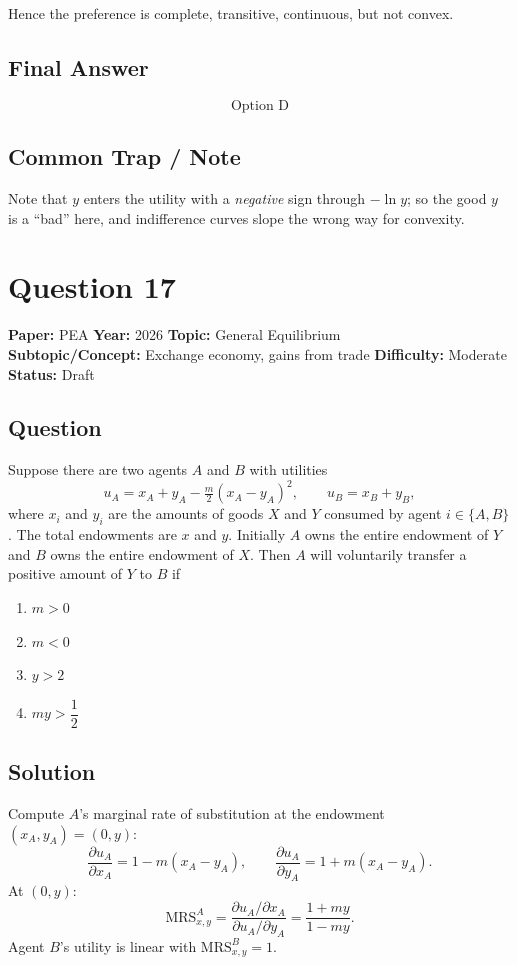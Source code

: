 \documentclass[11pt]{article}
\begin{document}
Hence the preference is complete, transitive, continuous, but not convex.

\subsection*{Final Answer}
\[
\boxed{\text{Option D}}
\]

\subsection*{Common Trap / Note}
Note that $y$ enters the utility with a \emph{negative} sign through $-\ln y$; so the good $y$ is a ``bad'' here, and indifference curves slope the wrong way for convexity.

\section*{Question 17}
\textbf{Paper:} PEA \quad \textbf{Year:} 2026 \quad \textbf{Topic:} General Equilibrium \\
\textbf{Subtopic/Concept:} Exchange economy, gains from trade \quad
\textbf{Difficulty:} Moderate \quad \textbf{Status:} Draft

\subsection*{Question}
Suppose there are two agents $A$ and $B$ with utilities
\[
u_A = x_A + y_A - \tfrac{m}{2}(x_A - y_A)^2, \qquad u_B = x_B + y_B,
\]
where $x_i$ and $y_i$ are the amounts of goods $X$ and $Y$ consumed by agent
$i \in \{A,B\}$. The total endowments are $x$ and $y$. Initially $A$ owns the
entire endowment of $Y$ and $B$ owns the entire endowment of $X$. Then $A$ will
voluntarily transfer a positive amount of $Y$ to $B$ if
\begin{enumerate}[label=(\Alph*)]
\item $m > 0$ \item $m < 0$ \item $y > 2$ \item $my > \dfrac{1}{2}$
\end{enumerate}

\subsection*{Solution}
Compute $A$'s marginal rate of substitution at the endowment $(x_A, y_A) = (0, y)$:
\[
\frac{\partial u_A}{\partial x_A} = 1 - m(x_A - y_A), \qquad
\frac{\partial u_A}{\partial y_A} = 1 + m(x_A - y_A).
\]
At $(0,y)$:
\[
\text{MRS}^A_{x,y}
= \frac{\partial u_A/\partial x_A}{\partial u_A/\partial y_A}
= \frac{1 + my}{1 - my}.
\]
Agent $B$'s utility is linear with $\text{MRS}^B_{x,y} = 1$.
\end{document}
